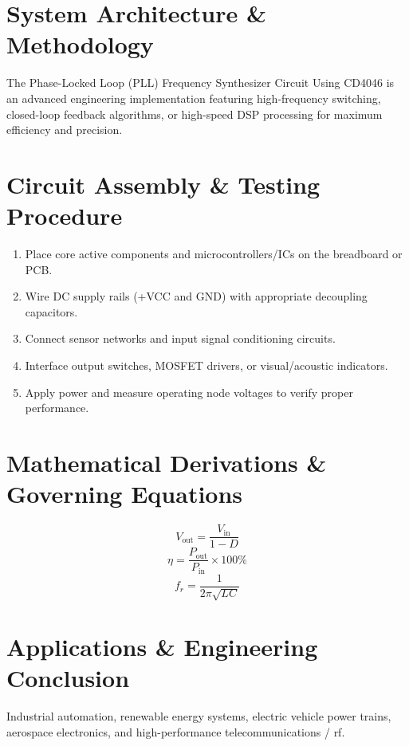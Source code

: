 \documentclass[11pt,a4paper]{article}
\begin{document}
\section{System Architecture \& Methodology}
The Phase-Locked Loop (PLL) Frequency Synthesizer Circuit Using CD4046 is an advanced engineering implementation featuring high-frequency switching, closed-loop feedback algorithms, or high-speed DSP processing for maximum efficiency and precision.

\section{Circuit Assembly \& Testing Procedure}
\begin{enumerate}
    \item Place core active components and microcontrollers/ICs on the breadboard or PCB.
    \item Wire DC supply rails (+VCC and GND) with appropriate decoupling capacitors.
    \item Connect sensor networks and input signal conditioning circuits.
    \item Interface output switches, MOSFET drivers, or visual/acoustic indicators.
    \item Apply power and measure operating node voltages to verify proper performance.
\end{enumerate}

\section{Mathematical Derivations \& Governing Equations}
\begin{equation}
V_{\text{out}} = \frac{V_{\text{in}}}{1 - D}
\end{equation}
\begin{equation}
\eta = \frac{P_{\text{out}}}{P_{\text{in}}} \times 100\%
\end{equation}
\begin{equation}
f_r = \frac{1}{2\pi \sqrt{L C}}
\end{equation}

\section{Applications \& Engineering Conclusion}
Industrial automation, renewable energy systems, electric vehicle power trains, aerospace electronics, and high-performance telecommunications / rf.
\end{document}
